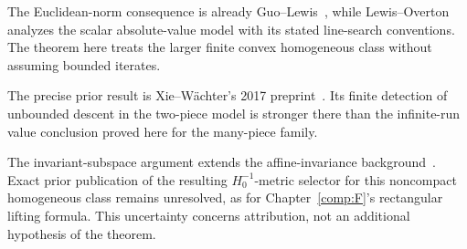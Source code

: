 The Euclidean-norm consequence is already Guo--Lewis~\cite[Corollary~4.2]{GL18}, while Lewis--Overton~\cite[Section~5.1]{LO} analyzes the scalar absolute-value model with its stated line-search conventions. The theorem here treats the larger finite convex homogeneous class without assuming bounded iterates.

The precise prior result is Xie--W\"achter's 2017 preprint~\cite[Theorem~IV.1]{XW}. Its finite detection of unbounded descent in the two-piece model is stronger there than the infinite-run value conclusion proved here for the many-piece family.

The invariant-subspace argument extends the affine-invariance background~\cite[Theorem~II.1]{XW}. Exact prior publication of the resulting $H_0^{-1}$-metric selector for this noncompact homogeneous class remains unresolved, as for Chapter~\ref{comp:F}'s rectangular lifting formula. This uncertainty concerns attribution, not an additional hypothesis of the theorem.
